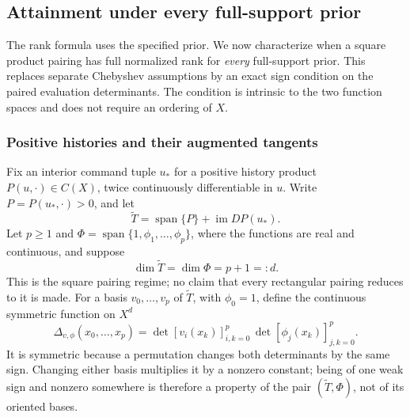 \subsection{Attainment under every full-support prior}
\label{sec:v18-universal}
The rank formula uses the specified prior. We now characterize when a
square product pairing has full normalized rank for \emph{every}
full-support prior. This replaces separate Chebyshev assumptions by an
exact sign condition on the paired evaluation determinants. The condition
is intrinsic to the two function spaces and does not require an ordering
of $X$.

\subsubsection{Positive histories and their augmented tangents}
Fix an interior command tuple $u_*$ for a positive history product
$P(u,\cdot)\in C(X)$, twice continuously differentiable in $u$. Write
$P=P(u_*,\cdot)>0$, and let
\begin{equation}\label{eq:v18-augmented-tangent}
 \widetilde T=\operatorname{span}\{P\}+\operatorname{im}DP(u_*).
\end{equation}
Let $p\ge1$ and $\Phi=\operatorname{span}\{1,\phi_1,\ldots,\phi_p\}$, where the
functions are real and continuous, and suppose
\begin{equation}\label{eq:v18-square-pair}
 \dim\widetilde T=\dim\Phi=p+1=:d.
\end{equation}
This is the square pairing regime; no claim that every rectangular
pairing reduces to it is made. For a basis $v_0,\ldots,v_p$ of
$\widetilde T$, with $\phi_0=1$, define the continuous symmetric
function on $X^d$
\begin{equation}\label{eq:v18-sign-kernel}
 \Delta_{v,\phi}(x_0,\ldots,x_p)
 =\det[v_i(x_k)]_{i,k=0}^p\,
  \det[\phi_j(x_k)]_{j,k=0}^p.
\end{equation}
It is symmetric because a permutation changes both determinants by the
same sign. Changing either basis multiplies it by a nonzero constant;
being of one weak sign and nonzero somewhere is therefore a property of
the pair $(\widetilde T,\Phi)$, not of its oriented bases.

